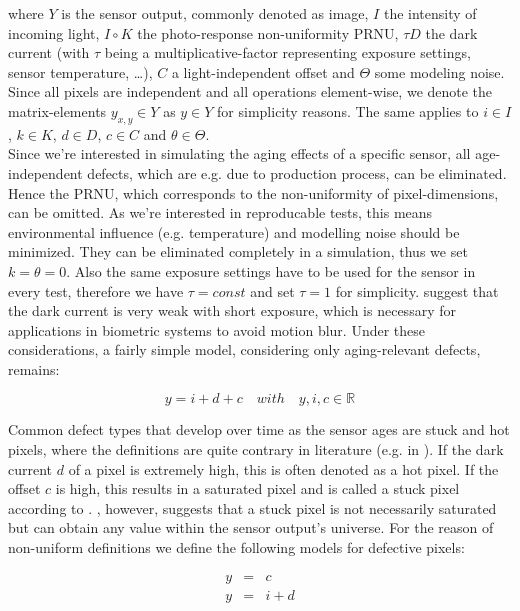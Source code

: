 \documentclass[10pt,twocolumn,letterpaper]{article}
\begin{document}
where $Y$ is the sensor output, commonly denoted as image, $I$ the intensity of incoming light, $I \circ K$ the photo-response non-uniformity PRNU, $\tau D$ the dark current (with $\tau$ being a multiplicative-factor representing exposure settings, sensor temperature, \dots), $C$ a light-independent offset and $\Theta$ some modeling noise. Since all pixels are independent \cite{fridrich, defectDetection} and all operations element-wise, we denote the matrix-elements $y_{x,y} \in Y$ as $ y \in Y$ for simplicity reasons. The same applies to $i \in I$, $k \in K$, $d \in D$, $c \in C$ and $\theta \in \Theta$.\\
Since we're interested in simulating the aging effects of a specific sensor, all age-independent defects, which are e.g. due to production process, can be eliminated. Hence the PRNU, which corresponds to the non-uniformity of pixel-dimensions, can be omitted. As we're interested in reproducable tests, this means environmental influence (e.g. temperature) and modelling noise should be minimized. They can be eliminated completely in a simulation, thus we set $k=\theta=0$. Also the same exposure settings have to be used for the sensor in every test, therefore we have $\tau = const$ and set $ \tau = 1$ for simplicity. \cite{camAndDisplays, radiometricCCD,failureSemi,fridrich} suggest that the dark current is very weak with short exposure, which is necessary for applications in biometric systems to avoid motion blur. Under these considerations, a fairly simple model, considering only aging-relevant defects, remains:

\begin{equation}
  \label{equ:pixemodelEasier}
  y = i + d + c \quad with \quad y,i,c \in \mathbb{R}
\end{equation}

Common defect types that develop over time as the sensor ages are stuck and hot pixels, where the definitions are quite contrary in literature (e.g. in \cite{fridrich, defectIdentification, failureSemi}). If the dark current $d$ of a pixel is extremely high, this is often denoted as a hot pixel. If the offset $c$ is high, this results in a saturated pixel and is called a stuck pixel according to \cite{fridrich}. \cite{defectIdentification}, however, suggests that a stuck pixel is not necessarily saturated but can obtain any value within the sensor output's universe. For the reason of non-uniform definitions we define the following models for defective pixels:

\begin{eqnarray}
  y & = & c \label{equ:Stuck} \\
  y & = & i + d \label{equ:Hot}
\end{eqnarray}
  
\end{document}
